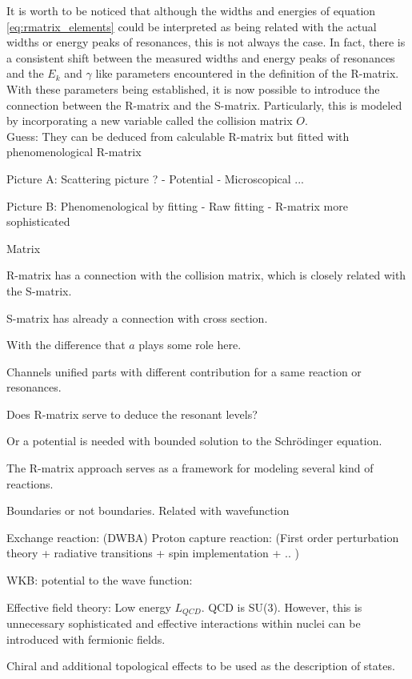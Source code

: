 \documentclass[openany]{book}
\begin{document}
It is worth to be noticed that although the widths and energies of equation \ref{eq:rmatrix_elements} could be interpreted as being related with the actual widths or energy peaks of resonances, this is not always the case. In fact, there is a consistent shift between the measured widths and energy peaks of resonances and the $E_k$ and $\gamma$ like parameters encountered in the definition of the R-matrix.  \\

With these parameters being established, it is now possible to introduce the connection between the R-matrix and the S-matrix. Particularly, this is modeled by incorporating a new variable called the collision matrix $O$. \\

Guess: They can be deduced from calculable R-matrix
but fitted with phenomenological R-matrix

Picture A: Scattering picture ?
	-	Potential 
	-	Microscopical ...
	
Picture B: Phenomenological by fitting 
	-	 Raw fitting 
	-	R-matrix more sophisticated 

Matrix

R-matrix has a connection with the collision matrix, which is closely related with the S-matrix. 

S-matrix has already a connection with cross section. 

With the difference that $a$ plays some role here. 

Channels unified parts with different contribution for a same reaction or resonances. 

Does R-matrix serve to deduce the resonant levels? 

Or a potential is needed with bounded solution to the Schrödinger equation.  

The R-matrix approach serves as a framework for modeling several kind of reactions. 

Boundaries or not boundaries. Related with wavefunction 

Exchange reaction: (DWBA)
Proton capture reaction: (First order perturbation theory + radiative transitions + spin implementation + .. )

WKB: potential to the wave function: 

Effective field theory: Low energy $L_{QCD}$. 
QCD is SU(3). However, this is unnecessary sophisticated and effective interactions within nuclei can be introduced with fermionic fields. 

Chiral and additional topological effects to be used as the description of states.
\end{document}
